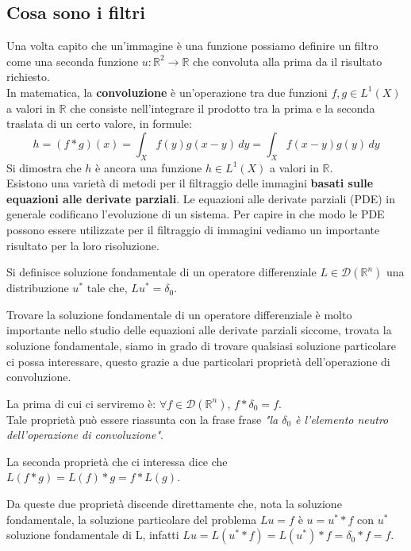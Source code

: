 \subsection{Cosa sono i filtri}
Una volta capito che un'immagine è una funzione possiamo definire un filtro come una seconda funzione $u:\mathbb R^2\rightarrow\mathbb R$ che convoluta alla prima da il risultato richiesto.\\ In matematica, la \textbf{convoluzione} è un'operazione tra due funzioni $f,g \in L^1(X)$ a valori in $\mathbb R$ che consiste nell'integrare il prodotto tra la prima e la seconda traslata di un certo valore, in formule:
$$
h=(f*g)(x)=\int _{X}f(y)g(x-y)\,dy=\int _{X}f(x-y)g(y)\,dy
$$
Si dimostra che $h$ è ancora una funzione $h \in L^1(X)$ a valori in $\mathbb R$.\\
\noindent 
Esistono una varietà di metodi per il filtraggio delle immagini \textbf{basati sulle equazioni alle derivate parziali}. Le equazioni alle derivate parziali (PDE) in generale codificano l'evoluzione di un sistema. Per capire in che modo le PDE possono essere utilizzate per il filtraggio di immagini vediamo un importante risultato per la loro risoluzione.
\begin{definizione}
Si definisce soluzione fondamentale di un operatore differenziale $L\in \mathcal{D}(\mathbb R^n)$ una distribuzione $u^*$ tale che, $Lu^*=\delta_0$. 
\end{definizione}
\noindent
Trovare la soluzione fondamentale di un operatore differenziale è molto importante nello studio delle equazioni alle derivate parziali siccome, trovata la soluzione fondamentale, siamo in grado di trovare qualsiasi soluzione particolare ci possa interessare, questo grazie a due particolari proprietà dell'operazione di convoluzione. \begin{proposizione}
La prima di cui ci serviremo è: $\forall f\in \mathcal{D}(\mathbb R^n)$, $f*\delta_0=f$.\\
Tale proprietà può essere riassunta con la frase frase \textit{"la $\delta_0$ è l'elemento neutro dell'operazione di convoluzione"}. 
\end{proposizione}
\begin{proposizione}
La seconda proprietà che ci interessa dice che\\ $L(f*g)=L(f)*g=f*L(g)$.
\end{proposizione}
\noindent
Da queste due proprietà discende direttamente che, nota la soluzione fondamentale, la soluzione particolare del problema $Lu=f$ è $u=u^**f$ con $u^*$ soluzione fondamentale di L, infatti $Lu=L(u^**f)=L(u^*)*f=\delta_0*f=f$.\\

